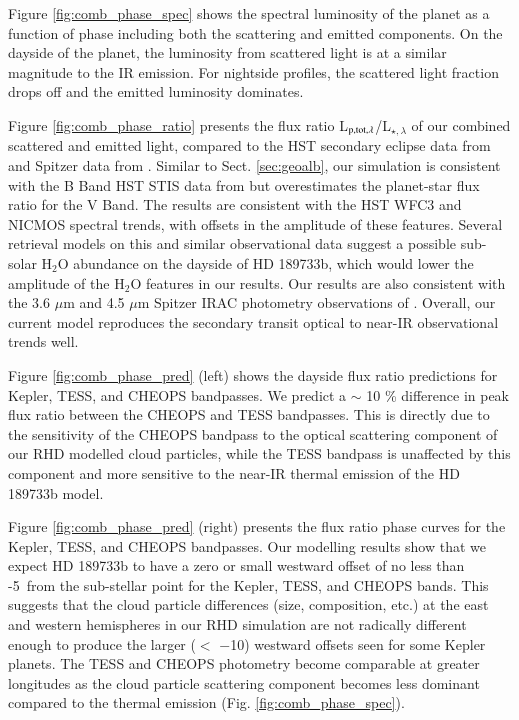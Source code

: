 \documentclass{aa}
\begin{document}
Figure \ref{fig:comb_phase_spec} shows the spectral luminosity of the planet as a function of phase including both the scattering and emitted components.
On the dayside of the planet, the luminosity from scattered light is at a similar magnitude to the IR emission.
For nightside profiles, the scattered light fraction drops off and the emitted luminosity dominates.

Figure \ref{fig:comb_phase_ratio} presents the flux ratio L$_{\rm p, tot, \lambda}$/L$_{\star, \lambda}$ of our combined scattered and emitted light, compared to the HST secondary eclipse data from \citet{Swain2009, Evans2013,Crouzet2014,Barstow2014} and Spitzer data from \citet{Knutson2012}.
Similar to Sect. \ref{sec:geoalb}, our simulation is consistent with the B Band HST STIS data from \citet{Evans2013} but overestimates the planet-star flux ratio for the V Band.
The results are consistent with the HST WFC3 \citep{Crouzet2014} and NICMOS \citep{Swain2009, Barstow2014} spectral trends, with offsets in the amplitude of these features. 
Several retrieval models on this and similar observational data \citep[e.g.][]{Madhusudhan2009,Lee2012,Line2012,Line2014} suggest a possible sub-solar H$_{2}$O abundance on the dayside of HD 189733b, which would lower the amplitude of the H$_{2}$O features in our results.
Our results are also consistent with the 3.6 $\mu$m and 4.5 $\mu$m Spitzer IRAC photometry observations of \citet{Knutson2012}. 
Overall, our current model reproduces the secondary transit optical to near-IR observational trends well.

Figure \ref{fig:comb_phase_pred} (left) shows the dayside flux ratio predictions for Kepler, TESS, and CHEOPS bandpasses.
We predict a $\sim$ 10 \% difference in peak flux ratio between the CHEOPS and TESS bandpasses.
This is directly due to the sensitivity of the CHEOPS bandpass to the optical scattering component of our RHD modelled cloud particles, while the TESS bandpass is unaffected by this component and more sensitive to the near-IR thermal emission of the HD 189733b model.

Figure \ref{fig:comb_phase_pred} (right) presents the flux ratio phase curves for the Kepler, TESS, and CHEOPS bandpasses.
Our modelling results show that we expect HD 189733b to have a zero or small westward offset of no less than -5\degr\ from the sub-stellar point for the Kepler, TESS, and CHEOPS bands.
This suggests that the cloud particle differences (size, composition, etc.) at the east and western hemispheres in our RHD simulation are not radically different enough to produce the larger ($<$ $-$10\degr) westward offsets seen for some Kepler planets.
The TESS and CHEOPS photometry become comparable at greater longitudes as the cloud particle scattering component becomes less dominant compared to the thermal emission (Fig. \ref{fig:comb_phase_spec}).
\end{document}
